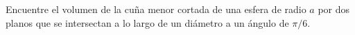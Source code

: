 \item Encuentre el volumen de la cuña menor cortada de una esfera de radio $a$ por dos planos que se intersectan a lo largo de un diámetro a un ángulo de $\pi/6$.
